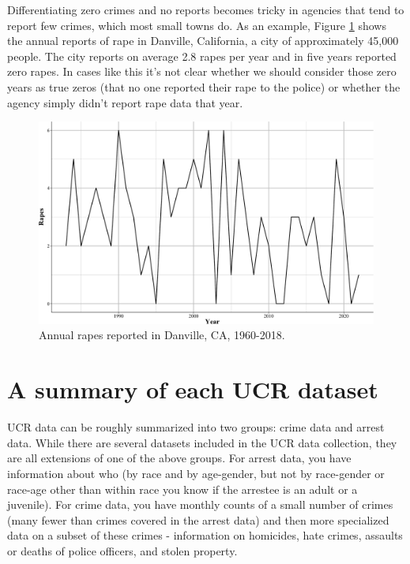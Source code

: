 \documentclass[
  12pt,
  openany]{book}
\begin{document}
Differentiating zero crimes and no reports becomes tricky in agencies that tend to report few crimes, which most small towns do. As an example, Figure \ref{fig:danvilleRape} shows the annual reports of rape in Danville, California, a city of approximately 45,000 people. The city reports on average 2.8 rapes per year and in five years reported zero rapes. In cases like this it's not clear whether we should consider those zero years as true zeros (that no one reported their rape to the police) or whether the agency simply didn't report rape data that year.

\begin{figure}
\centering
\includegraphics{ucrbook_files/figure-latex/danvilleRape-1.pdf}
\caption{\label{fig:danvilleRape}Annual rapes reported in Danville, CA, 1960-2018.}
\end{figure}

\hypertarget{a-summary-of-each-ucr-dataset}{%
\section{A summary of each UCR dataset}\label{a-summary-of-each-ucr-dataset}}

UCR data can be roughly summarized into two groups: crime data and arrest data. While there are several datasets included in the UCR data collection, they are all extensions of one of the above groups. For arrest data, you have information about who (by race and by age-gender, but not by race-gender or race-age other than within race you know if the arrestee is an adult or a juvenile). For crime data, you have monthly counts of a small number of crimes (many fewer than crimes covered in the arrest data) and then more specialized data on a subset of these crimes - information on homicides, hate crimes, assaults or deaths of police officers, and stolen property.
\end{document}
